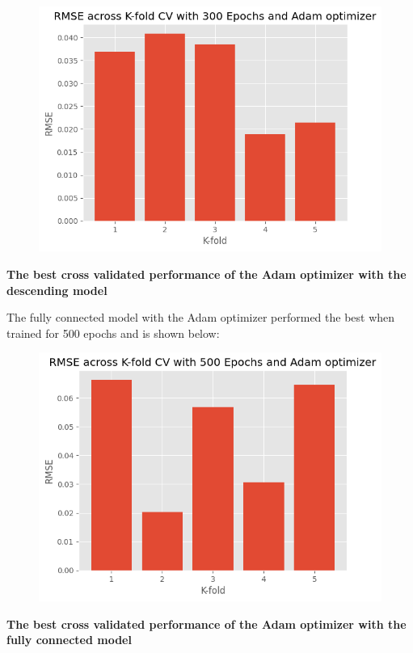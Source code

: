 \documentclass[12pt]{article}
\begin{document}
	\begin{figure}[H]
		\includegraphics[scale=0.400]{CV_descending_adam.png}
		\centering
	\end{figure}
	\begin{center}
		\textbf{\scriptsize The best cross validated performance of the Adam optimizer with the descending model}
	\end{center}

	The fully connected model with the Adam optimizer performed the best when trained for 500 epochs and is shown below:

	\begin{figure}[H]
		\includegraphics[scale=0.400]{CV_fullconnected_adam.png}
		\centering
	\end{figure}
	\begin{center}
		\textbf{\scriptsize The best cross validated performance of the Adam optimizer with the fully connected model}
	\end{center}
\end{document}

